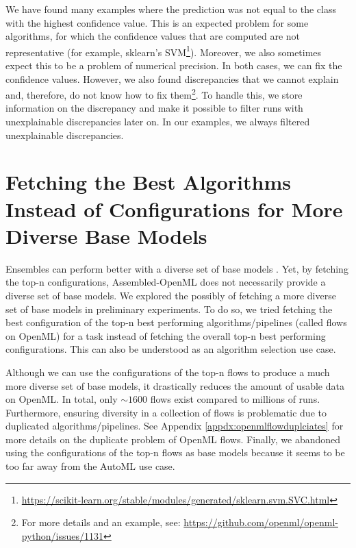 \documentclass[11pt]{article}
\begin{document}
We have found many examples where the prediction was not equal to the class with the highest confidence value.
This is an expected problem for some algorithms, for which the confidence values that are computed are not representative (for example, sklearn's SVM\footnote{\url{https://scikit-learn.org/stable/modules/generated/sklearn.svm.SVC.html}}). Moreover, we also sometimes expect this to be a problem of numerical precision. In both cases, we can fix the confidence values. 
However, we also found discrepancies that we cannot explain and, therefore, do not know how to fix them\footnote{For more details and an example, see: \url{https://github.com/openml/openml-python/issues/1131}}. 
To handle this, we store information on the discrepancy and make it possible to filter runs with unexplainable discrepancies later on. In our examples, we always filtered unexplainable discrepancies. 

\section{Fetching the Best Algorithms Instead of Configurations for More Diverse Base Models}
\label{appdx:diverser}
Ensembles can perform better with a diverse set of base models \citep{banfield2005ensemble}.
Yet, by fetching the top-n configurations, Assembled-OpenML does not necessarily provide a diverse set of base models. 
We explored the possibly of fetching a more diverse set of base models in preliminary experiments. 
To do so, we tried fetching the best configuration of the top-n best performing algorithms/pipelines (called flows on OpenML) for a task instead of fetching the overall top-n best performing configurations. 
This can also be understood as an algorithm selection use case.

Although we can use the configurations of the top-n flows to produce a much more diverse set of base models, it drastically reduces the amount of usable data on OpenML. 
In total, only ${\sim}1600$ flows exist compared to millions of runs.
Furthermore, ensuring diversity in a collection of flows is problematic due to duplicated algorithms/pipelines. See Appendix \ref{appdx:openmlflowduplciates} for more details on the duplicate problem of OpenML flows.
Finally, we abandoned using the configurations of the top-n flows as base models because it seems to be too far away from the AutoML use case. 
\end{document}
